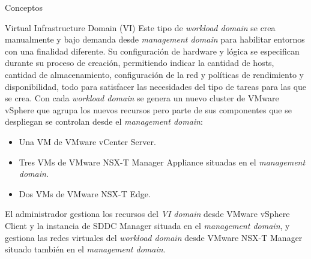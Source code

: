 \begin{section}{Conceptos}
\begin{subsubsection}{Virtual Infrastructure Domain (VI)}
\label{subsubsec:domainVI}
Este tipo de \textit{workload domain} se crea manualmente y bajo demanda desde \textit{management domain} para habilitar entornos con una finalidad diferente. Su configuración de hardware y lógica se especifican durante su proceso de creación, permitiendo indicar la cantidad de hosts, cantidad de almacenamiento, configuración de la red y políticas de rendimiento y disponibilidad, todo para satisfacer las necesidades del tipo de tareas para las que se crea. Con cada \textit{workload domain} se genera un nuevo cluster de VMware vSphere que agrupa los nuevos recursos pero parte de sus componentes que se despliegan se controlan desde el \textit{management domain}:
\begin{itemize}
  \item Una VM de VMware vCenter Server.
  \item Tres VMs de VMware NSX-T Manager Appliance situadas en el \textit{management domain}.
  \item Dos VMs de VMware NSX-T Edge.
\end{itemize}
El administrador gestiona los recursos del \textit{VI domain} desde VMware vSphere Client y la instancia de SDDC Manager situada en el \textit{management domain}, y gestiona las redes virtuales del \textit{workload domain} desde VMware NSX-T Manager situado también en el \textit{management domain}.


\end{subsubsection}
\end{section}
